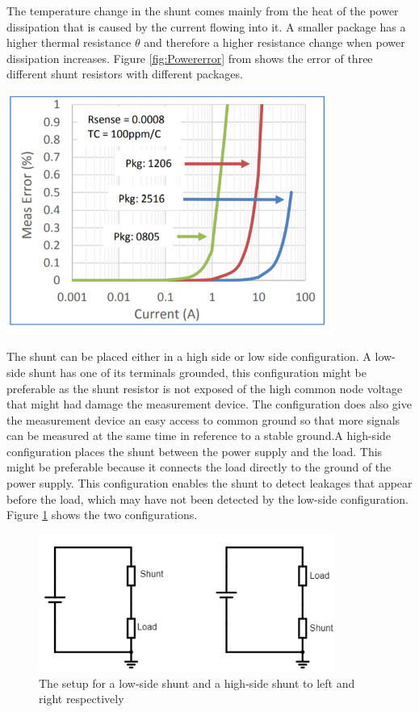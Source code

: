The temperature change in the shunt comes mainly from the heat of the power dissipation that is caused by the current flowing into it. A smaller package has a higher thermal resistance $\theta$ and therefore a higher resistance change when power dissipation increases. Figure \ref{fig:Powererror} from \cite{Intersil} shows the error of three different shunt resistors with different packages. 

\begin{minipage}[t]{0.8\textwidth}
\centering
    \includegraphics[width=0.8\textwidth]{Images/Powererror.PNG}\\
    \captionsetup{justification=centering}
    \label{fig:Powererror}
\end{minipage}


The shunt can be placed either in a high side or low side configuration. A low-side shunt has one of its terminals grounded, this configuration might be preferable as the shunt resistor is not exposed of the high common node voltage that might had damage the measurement device. The configuration does also give the measurement device an easy access to common ground so that more signals can be measured at the same time in reference to a stable ground.A high-side configuration places the shunt between the power supply and the load. This might be preferable because it connects the load directly to the ground of the power supply. This configuration enables the shunt to detect leakages that appear before the load, which may have not been detected by the low-side configuration. Figure \ref{fig:shunt} shows the two configurations. \hfill \break


\begin{figure}[h]
\centering
\includegraphics[height=4.5cm]{Project_Report/Images/shunt.PNG}
\caption{The setup for a low-side shunt and a high-side shunt to left and right respectively}
\label{fig:shunt}
\end{figure}




